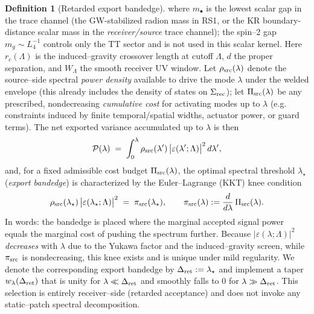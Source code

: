 \documentclass[10pt]{article}
\theoremstyle{definition}
\newtheorem{definition}{Definition}[section]
\theoremstyle{plain}
\begin{document}
\begin{definition}[Retarded export bandedge]
where $m_\bullet$ is the lowest scalar gap in the trace channel (the GW-stabilized radion mass in RS1, or the
KR boundary-distance scalar mass in the \emph{receiver/source} trace channel); the spin--2 gap $m_g\sim L_4^{-1}$
controls only the TT sector and is not used in this scalar kernel. Here $r_c(\Lambda)$ is the induced--gravity
crossover length at cutoff $\Lambda$, $d$ the proper separation, and $W_\Lambda$ the smooth receiver UV window.
Let $\rho_{\rm src}(\lambda)$ denote the source–side spectral \emph{power density} available to drive the
mode $\lambda$ under the welded envelope (this already includes the density of states on $\Sigma_{\rm rec}$);
let $\Pi_{\rm src}(\lambda)$ be any prescribed, nondecreasing \emph{cumulative cost} for activating modes
up to $\lambda$ (e.g. constraints induced by finite temporal/spatial widths, actuator power, or guard terms).
The net exported variance accumulated up to $\lambda$ is then
\[
{\cal P}(\lambda)\;=\;\int_0^\lambda \rho_{\rm src}(\lambda')\,\big|\varepsilon(\lambda';\Lambda)\big|^2\,d\lambda',
\]
and, for a fixed admissible cost budget $\Pi_{\rm src}(\lambda)$, the optimal spectral threshold
$\lambda_\star$ (\emph{export bandedge}) is characterized by the Euler–Lagrange (KKT) knee condition
\begin{equation}
\label{eq:knee}
\rho_{\rm src}(\lambda_\star)\,\big|\varepsilon(\lambda_\star;\Lambda)\big|^2
\;=\;\pi_{\rm src}(\lambda_\star),\qquad \pi_{\rm src}(\lambda):=\frac{d}{d\lambda}\,\Pi_{\rm src}(\lambda).
\end{equation}
In words: the bandedge is placed where the marginal accepted signal power equals the marginal cost of
pushing the spectrum further. Because $\big|\varepsilon(\lambda;\Lambda)\big|^2$ \emph{decreases} with
$\lambda$ due to the Yukawa factor and the induced–gravity screen, while $\pi_{\rm src}$ is nondecreasing,
this knee exists and is unique under mild regularity. We denote the corresponding export bandedge by
$\Delta_{\rm ret}:=\lambda_\star$ and implement a taper $w_\lambda(\Delta_{\rm ret})$ that is unity for
$\lambda\ll \Delta_{\rm ret}$ and smoothly falls to $0$ for $\lambda\gg \Delta_{\rm ret}$. This selection
is entirely receiver–side (retarded acceptance) and does not invoke any static–patch spectral decomposition.
\end{definition}
\end{document}
